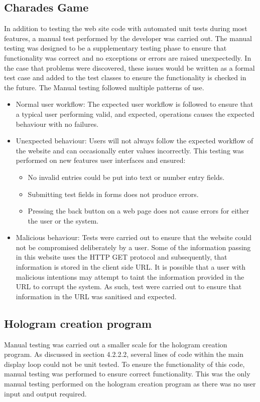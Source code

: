\subsection{Charades Game}
In addition to testing the web site code with automated unit tests during most features, a manual test performed by the developer was carried out. The manual testing was designed to be a supplementary testing phase to ensure that functionality was correct and no exceptions or errors are raised unexpectedly. In the case that problems were discovered, these issues would be written as a formal test case and added to the test classes to ensure the functionality is checked in the future. The Manual testing followed multiple patterns of use.
\begin{itemize}
	\item Normal user workflow: The expected user workflow is followed to ensure that a typical user performing valid, and expected, operations causes the expected behaviour with no failures.
	
	\item Unexpected behaviour: Users will not always follow the expected workflow of the website and can occasionally enter values incorrectly. This testing was performed on new features user interfaces and ensured:
	\begin{itemize}
		\item No invalid entries could be put into text or number entry fields.
		\item Submitting test fields in forms does not produce errors. 
		\item Pressing the back button on a web page does not cause errors for either the user or the system.
	\end{itemize}
	
	\item Malicious behaviour: Tests were carried out to ensure that the website could not be compromised deliberately by a user. Some of the information passing in this website uses the HTTP GET protocol and subsequently, that information is stored in the client side URL. It is possible that a user with malicious intentions may attempt to taint the information provided in the URL to corrupt the system. As such, test were carried out to ensure that information in the URL was sanitised and expected.
\end{itemize}


\subsection{Hologram creation program}
Manual testing was carried out a smaller scale for the hologram creation program. As discussed in section 4.2.2.2, several lines of code within the main display loop could not be unit tested. To ensure the functionality of this code, manual testing was performed to ensure correct functionality. This was the only manual testing performed on the hologram creation program as there was no user input and output required.


